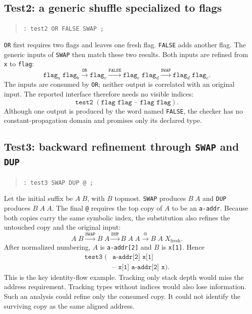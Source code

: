 \documentclass[11pt,a4paper]{article}
\begin{document}
\subsection{Test2: a generic shuffle specialized to flags}

\begin{quote}
\texttt{: test2  OR FALSE SWAP ;}
\end{quote}
\texttt{OR} first requires two flags and leaves one fresh flag.  \texttt{FALSE}
adds another flag.  The generic inputs of \texttt{SWAP} then match these two
results.  Both inputs are refined from \texttt{x} to \texttt{flag}:
\[
 \texttt{flag}_a\;\texttt{flag}_b
 \xrightarrow{\texttt{OR}}
 \texttt{flag}_c
 \xrightarrow{\texttt{FALSE}}
 \texttt{flag}_c\;\texttt{flag}_d
 \xrightarrow{\texttt{SWAP}}
 \texttt{flag}_d\;\texttt{flag}_c.
\]
The inputs are consumed by \texttt{OR}; neither output is correlated with an
original input.  The reported interface therefore needs no visible indices:
\[
           \texttt{test2}\;(\texttt{flag flag -- flag flag}).
\]
Although one output is produced by the word named \texttt{FALSE}, the checker
has no constant-propagation domain and promises only its declared type.

\subsection{Test3: backward refinement through \texttt{SWAP} and
\texttt{DUP}}

\begin{quote}
\texttt{: test3  SWAP DUP @ ;}
\end{quote}
Let the initial suffix be $A\;B$, with $B$ topmost.  \texttt{SWAP} produces
$B\;A$ and \texttt{DUP} produces $B\;A\;A$.  The final \texttt{@} requires
the top copy of $A$ to be an \texttt{a-addr}.  Because both copies carry the
same symbolic index, the substitution also refines the untouched copy and the
original input:
\[
 A\;B
 \xrightarrow{\texttt{SWAP}} B\;A
 \xrightarrow{\texttt{DUP}} B\;A\;A
 \xrightarrow{\texttt{@}} B\;A\;X_{\mathrm{fresh}}.
\]
After normalized numbering, $A$ is \texttt{a-addr[2]} and $B$ is
\texttt{x[1]}.  Hence
\[
\begin{split}
 \texttt{test3}\;(&\texttt{a-addr[2] x[1]}\\
                  &\texttt{-- x[1] a-addr[2] x}).
\end{split}
\]
This is the key identity-flow example.  Tracking only stack depth would miss
the address requirement.  Tracking types without indices would also lose
information.  Such an analysis could refine only the consumed copy.  It could
not identify the surviving copy as the same aligned address.
\end{document}
